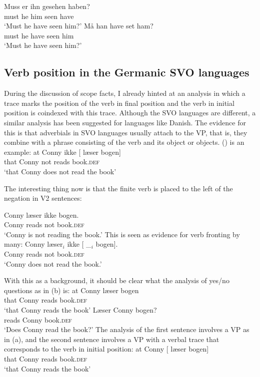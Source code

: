\eal
\ex 
\gll Muss er ihn gesehen haben?\\
     must he him seen have\\\german
\glt `Must he have seen him?'
\ex 
\gll Må han have set ham?\\
     must he have seen him\\\danish
\glt `Must he have seen him?'
\zl





\subsection{Verb position in the Germanic SVO languages}
\label{sec-danish-verb-movement}\label{sec-Germanic-SVO-verb-position}

During the discussion of scope facts, I already hinted at an analysis in which a trace marks the
position of the verb in final position and the verb in initial position is coindexed with this
trace. Although the SVO languages are different, a similar analysis has been suggested for languages
like Danish. The evidence for this is that adverbials in SVO languages usually attach to the VP,
that is, they combine with a phrase consisting of the verb and its object or objects. () is
an example:
\ea
\gll  at   Conny ikke [ læser bogen]\\
      that Conny not      {}        reads          book.\textsc{def}\\\danish
\glt `that Conny does not read the book'
\z

The interesting thing now is that the finite verb is placed to the left of the negation in V2 sentences:

\ea
\gll  Conny læser ikke bogen.\\
       Conny reads   not  book.\textsc{def}\\\danish
\glt `Conny is not reading the book.'
\z
This is seen as evidence for verb fronting by many:
\ea
\gll  Conny læser$_i$ ikke [ \_$_i$ bogen].\\
      Conny reads      not  {} {}    book.\textsc{def}\\\danish
\glt `Conny does not read the book.'
\z
\nocite{KS2002a}

With this as a background, it should be clear what the analysis of yes/no questions as in (b) is:
\eal
\ex
\gll at Conny læser bogen\\
     that Conny reads book.\textsc{def}\\\danish
\glt `that Conny reads the book'
\ex\label{ex-laeser-jens-bogen}
\gll Læser Conny bogen?\\
     reads Conny book.\textsc{def}\\
\glt `Does Conny read the book?'
\zl
The analysis of the first sentence involves a VP as in (a), and the second sentence involves a
VP with a verbal trace that corresponds to the verb in initial position:
\eal
\ex
\gll at Conny [ læser bogen]\\
     that Conny {} reads book.\textsc{def}\\\danish
\glt `that Conny reads the book'

